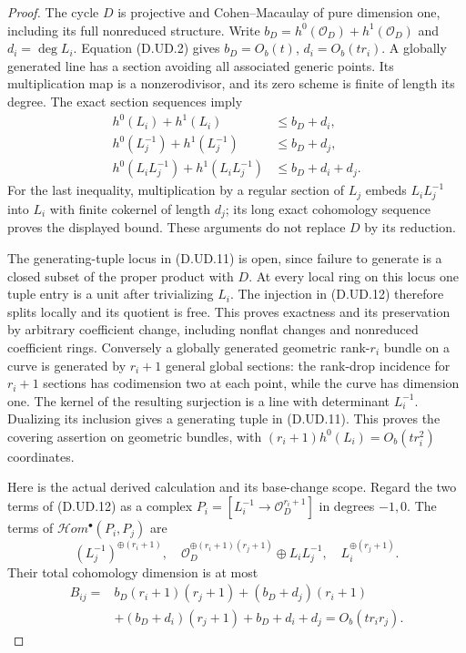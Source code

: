 \begin{proof}
The cycle $D$ is projective and Cohen--Macaulay of pure dimension
one, including its full nonreduced structure. Write
$b_D=h^0(\mathcal O_D)+h^1(\mathcal O_D)$ and
$d_i=\deg L_i$. Equation (D.UD.2) gives
$b_D=O_b(t)$, $d_i=O_b(tr_i)$.
A globally generated line has a section avoiding all associated
generic points. Its multiplication map is a nonzerodivisor,
and its zero scheme is finite of length its degree. The exact
section sequences imply
\[
 \begin{split}
 h^0(L_i)+h^1(L_i)&\le b_D+d_i,\\
 h^0(L_j^{-1})+h^1(L_j^{-1})&\le b_D+d_j,\\
 h^0(L_iL_j^{-1})+h^1(L_iL_j^{-1})&\le b_D+d_i+d_j.
 \end{split}                                           \tag{D.UD.14}
\]
For the last inequality, multiplication by a regular section of
$L_j$ embeds $L_iL_j^{-1}$ into $L_i$ with finite cokernel of
length $d_j$; its long exact cohomology sequence proves the
displayed bound. These arguments do not replace $D$ by its
reduction.

The generating-tuple locus in (D.UD.11) is open, since failure
to generate is a closed subset of the proper product with $D$.
At every local ring on this locus one tuple entry is a unit
after trivializing $L_i$. The injection in (D.UD.12) therefore
splits locally and its quotient is free. This proves exactness
and its preservation by arbitrary coefficient change, including
nonflat changes and nonreduced coefficient rings.
Conversely a globally generated geometric rank-$r_i$ bundle
on a curve is generated by $r_i+1$ general global sections:
the rank-drop incidence for $r_i+1$ sections has codimension
two at each point, while the curve has dimension one.
The kernel of the resulting surjection is a line with
determinant $L_i^{-1}$. Dualizing its inclusion gives a
generating tuple in (D.UD.11). This proves the covering
assertion on geometric bundles, with
$(r_i+1)h^0(L_i)=O_b(tr_i^2)$ coordinates.

Here is the actual derived calculation and its base-change
scope. Regard the two terms of (D.UD.12) as a complex
$P_i=[L_i^{-1}\to\mathcal O_D^{r_i+1}]$ in degrees $-1,0$.
The terms of $\mathcal Hom^\bullet(P_i,P_j)$ are
\[
 (L_j^{-1})^{\oplus(r_i+1)},\quad
 \mathcal O_D^{\oplus(r_i+1)(r_j+1)}\oplus L_iL_j^{-1},
 \quad L_i^{\oplus(r_j+1)}.                            \tag{D.UD.15}
\]
Their total cohomology dimension is at most
\[
 \begin{split}
 B_{ij}={}&b_D(r_i+1)(r_j+1)+(b_D+d_j)(r_i+1)\\
          &+(b_D+d_i)(r_j+1)+b_D+d_i+d_j
                  =O_b(tr_ir_j).
 \end{split}                                           \tag{D.UD.16}
\]


\end{proof}
